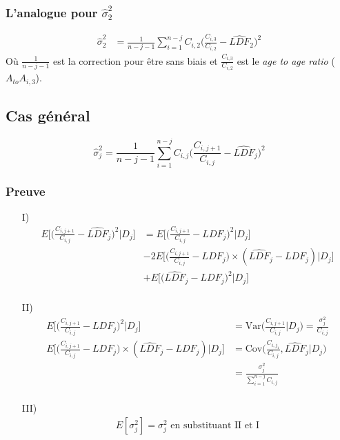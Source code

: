 \subsubsection*{L'analogue pour $\widehat{\sigma}_2^2$}
\begin{align*}
\widehat{\sigma}_2^2 &= \frac{1}{n-j-1} \sum_{i=1}^{n-j} C_{i,2} \Bigg( \frac{C_{i,3}}{C_{i,2}} - \widehat{LDF}_2\Bigg)^2
\end{align*}
Où $\frac{1}{n-j-1}$ est la correction pour être sans biais et $\frac{C_{i,3}}{C_{i,2}}$ est le \emph{age to age ratio} ($A_{to}A_{i,3}$).

\subsection*{Cas général}
\begin{equation}
\label{eq:est:sigm}
\widehat{\sigma}_j^2 = \frac{1}{n-j-1} \sum_{i=1}^{n-j} C_{i,j} \Bigg( \frac{C_{i,j+1}}{C_{i,j}} - \widehat{LDF}_j\Bigg)^2
\end{equation}

\subsubsection*{Preuve}
\begin{itemize}
\item[I)]\begin{align*}
E \Bigg[ \Bigg( \frac{C_{i,j+1}}{C_{i,j}} - \widehat{LDF}_j \Bigg)^2 \bigg| D_j \Bigg] &= E \Bigg[ \Bigg( \frac{C_{i,j+1}}{C_{i,j}} - LDF_j\Bigg)^2 \Bigg| D_j \Bigg] \\ 
&- 2 E \Bigg[ \Bigg( \frac{C_{i,j+1}}{C_{i,j}} - LDF_j\Bigg) \times (\widehat{LDF}_j - LDF_j) \Bigg| D_j \Bigg] \\
&+ E \Bigg[ \Bigg( \widehat{LDF}_j- LDF_j \Bigg)^2 \Bigg| D_j \Bigg] \\
\end{align*}
\item[II)]\begin{align*}
E \Bigg[ \Bigg( \frac{C_{i,j+1}}{C_{i,j}} - LDF_j\Bigg)^2 \Bigg| D_j \Bigg] &= \text{Var}\Bigg( \frac{C_{i,j+1}}{C_{i,j}} \Bigg|D_j\Bigg) = \frac{\sigma_j^2}{C_{i,j}} \\
E \Bigg[ \Bigg( \frac{C_{i,j+1}}{C_{i,j}} - LDF_j\Bigg) \times (\widehat{LDF}_j - LDF_j) \Bigg| D_j \Bigg]  &= \text{Cov} \Bigg( \frac{C_{i,j_1}}{C_{i,j}}, \widehat{LDF}_j \Bigg|D_j \Bigg) \\
&= \frac{\sigma_j^2}{\sum_{i=1}^{n-j} C_{i,j}} \\
\end{align*}
\item[III)] \begin{align*}
E[\sigma_j^2] = \sigma_j^2 \text{ en substituant II et I}
\end{align*}
\end{itemize}
\bigskip


